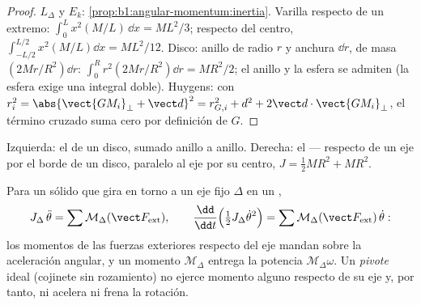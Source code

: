 \begin{proof}
$L_\Delta$ y $E_k$: \cref{prop:b1:angular-momentum:inertia}. Varilla
respecto de un extremo: $\int_0^L x^2(M/L)\,\dd x = ML^2/3$; respecto del
centro, $\int_{-L/2}^{L/2}
x^2(M/L)\dd x = ML^2/12$. Disco: anillo de radio $r$ y anchura $\dd r$, de
masa $(2Mr/R^2)\dd r$: $\int_0^R r^2(2Mr/R^2)\dd r = MR^2/2$; el anillo y la
esfera se admiten (la esfera exige una integral doble). Huygens: con
$r_i^2 = \abs{\vect{GM_i}_\perp + \vect d}^2 = r_{G,i}^2 + d^2 + 2\vect d\cdot
\vect{GM_i}_\perp$, el término cruzado suma cero por definición de $G$.
\end{proof}

\begin{omfigure}

{\small Izquierda: el  de un disco, sumado anillo a
anillo. Derecha: el  --- respecto de un eje por el borde
de un disco, paralelo al eje por su centro, $J = \tfrac12 MR^2 + MR^2$.}
\end{omfigure}

\begin{theorem}\label{thm:b1:systems-of-points:rotation}
Para un sólido que gira en torno a un eje fijo $\Delta$ en un ,
\[
J_\Delta\,\ddot\theta = \sum\mathcal M_\Delta(\vect F_{\mathrm{ext}}),
\qquad
\frac{\dd}{\dd t}\Big(\tfrac12 J_\Delta\dot\theta^2\Big) = \sum\mathcal M_\Delta(\vect F_{\mathrm{ext}})\,\dot\theta :
\]
los momentos de las fuerzas exteriores respecto del eje mandan sobre la
aceleración angular, y un momento $\mathcal M_\Delta$ entrega la potencia
$\mathcal M_\Delta\omega$. Un \emph{pivote} ideal (cojinete sin rozamiento) no
ejerce momento alguno respecto de su eje y, por tanto, ni acelera ni frena
la rotación.
\end{theorem}


